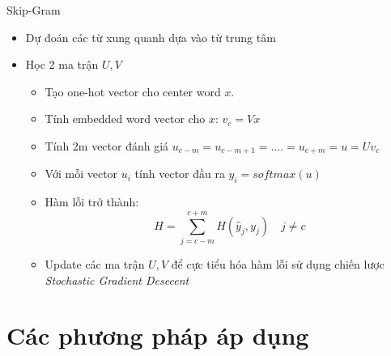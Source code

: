 \documentclass[compress]{beamer}
\begin{document}
\begin{frame}{Skip-Gram}
\begin{itemize}
\item Dự đoán các từ xung quanh dựa vào từ trung tâm
\item Học 2 ma trận $U,V$
\begin{itemize}
\item Tạo one-hot vector cho center word $x$.
\item Tính embedded word vector cho $x$: $v_c = Vx$
\item Tính 2m vector đánh giá $u_{c-m} = u_{c-m+1} = .... = u_{c+m} = u = Uv_c$
\item Với mỗi vector $u_i$ tính vector đầu ra $y_i = softmax(u)$
\item Hàm lỗi trở thành:
$$H = \sum_{j=c-m}^{c+m} H(\hat{y}_j,y_j) \quad j \neq c$$
\item Update các ma trận $U, V$ để cực tiểu hóa hàm lỗi sử dụng chiến lược \emph{Stochastic Gradient Desecent}
\end{itemize}
\end{itemize}
\end{frame}

\section{Các phương pháp áp dụng}
\end{document}
